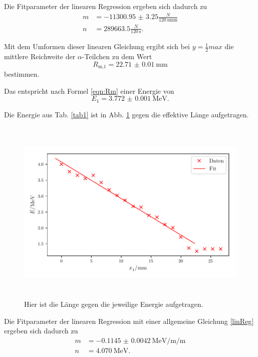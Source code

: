 \noindent Die Fitparameter der linearen Regression ergeben sich dadurch zu 
\begin{align*}
    m &= - \num{11300.95(325)} \frac{N}{\SI{120}{\second} \si{\milli\meter}} \\
    n &= \num{289663.5} \frac{N}{\SI{120}{\second}} .
\end{align*}


\noindent Mit dem Umformen dieser linearen Gleichung ergibt sich bei $y = \frac{1}{2} max$ die mittlere Reichweite der $\alpha$-Teilchen zu dem Wert %
\begin{equation*}
    R_\text{m,1} = \SI{22.71(1)}{\milli\meter}
\end{equation*}
bestimmen.

\noindent Das entspricht nach Formel \eqref{eqn:Rm} einer Energie von %
\begin{equation*}
    E_1 = \SI{3.772(1)}{\mega\electronvolt}.
\end{equation*}

Die Energie aus Tab. \ref{tab1} ist in Abb. \ref{fig:energie1} gegen die effektive Länge aufgetragen.
\begin{figure}
    \centering
    \includegraphics[width=12cm, height=9cm]{build/plotb.pdf}
    \caption{Hier ist die Länge gegen die jeweilige Energie aufgetragen.}
    \label{fig:energie1}
\end{figure}

\noindent Die Fitparameter der linearen Regression mit einer allgemeine Gleichung \eqref{linReg} ergeben sich dadurch zu 
\begin{align*}
    m &= - \SI{0.1145(42)}{\mega\electronvolt\per\milli\per\meter} \\
    n &= \SI{4.070}{\mega\electronvolt} .
\end{align*}

